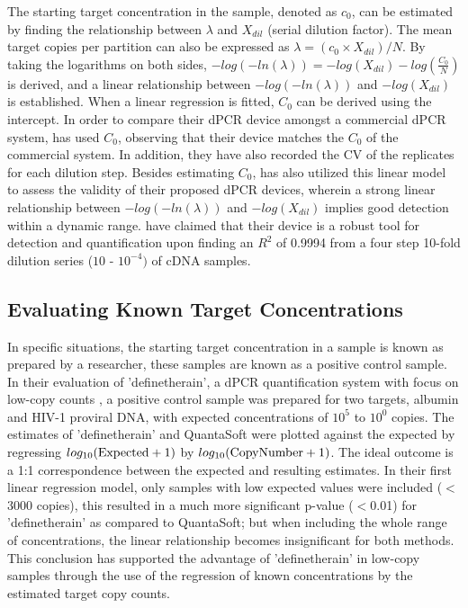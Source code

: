 The starting target concentration in the sample, denoted as \(c_0\), can be estimated by finding the relationship between \(\lambda\) and \(X_{dil}\) (serial dilution factor). The mean target copies per partition can also be expressed as \(\lambda = (c_0 \times X_{dil})/N \). By taking the logarithms on both sides, \(-log(-ln(\lambda)) = -log(X_{dil}) - log(\frac{C_0}{N})\) is derived, and a linear relationship between  \(-log(-ln(\lambda))\) and \(-log(X_{dil})\) is established. When a linear regression is fitted, \(C_0\) can be derived using the intercept. In order to compare their dPCR device amongst a commercial dPCR system,  has used \(C_0\), observing that their device matches the \(C_0\) of the commercial system. In addition, they have also recorded the CV of the replicates for each dilution step. Besides estimating \(C_0\),  has also utilized this linear model to assess the validity of their proposed dPCR devices, wherein a strong linear relationship between \(-log(-ln(\lambda))\) and \(-log(X_{dil})\) implies good detection within a dynamic range.  have claimed that their device is a robust tool for detection and quantification upon finding an \(R^2\) of 0.9994 from a four step 10-fold dilution series (\(10\) - \(10^{-4})\) of cDNA samples.

\subsection{Evaluating Known Target Concentrations}
\label{sec:ch2_perfeval_essentialMetrics}
In specific situations, the starting target concentration in a sample is known as prepared by a researcher, these samples are known as a positive control sample. In their evaluation of 'definetherain', a dPCR quantification system with focus on low-copy counts \cite{Jones2014}, a positive control sample was prepared for two targets, albumin and HIV-1 proviral DNA, with expected concentrations of \(10^5\) to \(10^0\) copies. The estimates of 'definetherain' and QuantaSoft were plotted against the expected by regressing \(log_{10}(\textup{Expected} + 1)\) by \(log_{10}(\textup{CopyNumber} + 1)\). The ideal outcome is a 1:1 correspondence between the expected and resulting estimates. In their first linear regression model, only samples with low expected values were included ($<$3000 copies), this resulted in a much more significant p-value ($<$0.01) for 'definetherain' as compared to QuantaSoft; but when including the whole range of concentrations, the linear relationship becomes insignificant for both methods. This conclusion has supported the advantage of 'definetherain' in low-copy samples through the use of the regression of known concentrations by the estimated target copy counts.